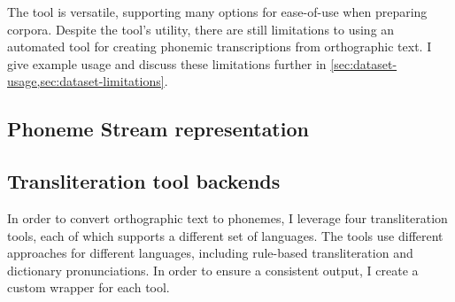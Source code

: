 The tool is versatile, supporting many options for ease-of-use when preparing corpora. Despite the tool's utility, there are still limitations to using an automated tool for creating phonemic transcriptions from orthographic text. I give example usage and discuss these limitations further in \cref{sec:dataset-usage,sec:dataset-limitations}.


\subsection{Phoneme Stream representation}
\label{sec:dataset-phoneme-stream}

\subsection{Transliteration tool backends}
\label{sec:dataset-transliteration-tool-backends}

In order to convert orthographic text to phonemes, I leverage four transliteration tools, each of which supports a different set of languages. The tools use different approaches for different languages, including rule-based transliteration and dictionary pronunciations. In order to ensure a consistent output, I create a custom wrapper for each tool.

